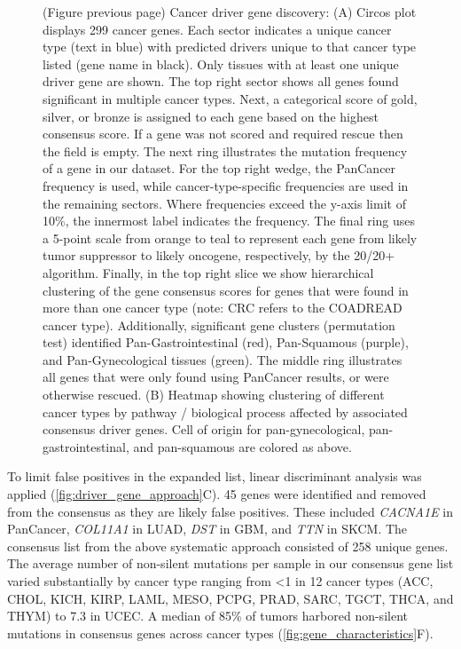 \begin{figure} [t!]
  \caption[(continued) Cancer driver gene discovery]{(Figure previous page) Cancer driver gene discovery: (A) Circos \cite{RN182} plot displays 299 cancer genes. Each sector indicates a unique cancer type (text in blue) with predicted drivers unique to that cancer type listed (gene name in black). Only tissues with at least one unique driver gene are shown. The top right sector shows all genes found significant in multiple cancer types. Next, a categorical score of gold, silver, or bronze is assigned to each gene based on the highest consensus score. If a gene was not scored and required rescue then the field is empty. The next ring illustrates the mutation frequency of a gene in our dataset. For the top right wedge, the PanCancer frequency is used, while cancer-type-specific frequencies are used in the remaining sectors. Where frequencies exceed the y-axis limit of 10\%, the innermost label indicates the frequency. The final ring uses a 5-point scale from orange to teal to represent each gene from likely tumor suppressor to likely oncogene, respectively, by the 20/20+ algorithm. Finally, in the top right slice we show hierarchical clustering of the gene consensus scores for genes that were found in more than one cancer type (note: CRC refers to the COADREAD cancer type). Additionally, significant gene clusters (permutation test) identified Pan-Gastrointestinal (red), Pan-Squamous (purple), and Pan-Gynecological tissues (green). The middle ring illustrates all genes that were only found using PanCancer results, or were otherwise rescued. (B) Heatmap showing clustering of different cancer types by pathway / biological process affected by associated consensus driver genes. Cell of origin for pan-gynecological, pan-gastrointestinal, and pan-squamous are colored as above.}
\end{figure}

To limit false positives in the expanded list, linear discriminant analysis was applied (\autoref{fig:driver_gene_approach}C). 45 genes were identified and removed from the consensus as they are likely false positives. These included \textit{CACNA1E} in PanCancer, \textit{COL11A1} in LUAD, \textit{DST} in GBM, and \textit{TTN} in SKCM. The consensus list from the above systematic approach consisted of 258 unique genes. The average number of non-silent mutations per sample in our consensus gene list varied substantially by cancer type ranging from <1 in 12 cancer types (ACC, CHOL, KICH, KIRP, LAML, MESO, PCPG, PRAD, SARC, TGCT, THCA, and THYM) to 7.3 in UCEC. A median of 85\% of tumors harbored non-silent mutations in consensus genes across cancer types (\autoref{fig:gene_characteristics}F). 

